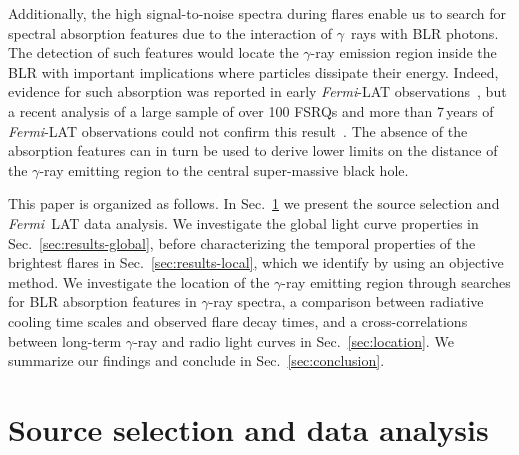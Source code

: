 \documentclass[twocolumn,linenumbers]{aastex62}
\newcommand{\Grays}{$\gamma$~rays\xspace}
\newcommand{\gray}{$\gamma$-ray\xspace}
\newcommand{\FermiLAT}{\emph{Fermi}~LAT\xspace}
\newcommand{\fermiLAT}{\emph{Fermi}-LAT\xspace}
\begin{document}
Additionally, the high signal-to-noise spectra during flares enable us to search for spectral absorption features due to the interaction of \Grays with BLR photons.
The detection of such features would locate the \gray emission region inside the BLR with important implications where particles dissipate their energy. 
Indeed, evidence for such absorption was reported in early  \fermiLAT observations~\citep{2010ApJ...717L.118P,2014ApJ...794....8S}, but a recent analysis of a large sample of over 100 FSRQs and more than 7\,years of \fermiLAT observations could not confirm this result~\citep{2018MNRAS.477.4749C}.
The absence of the absorption features can in turn be used to derive lower limits on the distance of the \gray emitting region to the central super-massive black hole. 

This paper is organized as follows. 
In Sec.~\ref{sec:data} we present the source selection and \FermiLAT data analysis. 
We investigate the global light curve properties in Sec.~\ref{sec:results-global}, before characterizing the temporal properties of the brightest flares in Sec.~\ref{sec:results-local}, which we identify by using an objective method.
We investigate the location of the \gray emitting region through searches for BLR absorption features in \gray spectra, a comparison between radiative cooling time scales and observed flare decay times, and a cross-correlations between long-term \gray and radio light curves in Sec.~\ref{sec:location}. 
We summarize our findings and conclude in Sec.~\ref{sec:conclusion}.

\section{Source selection and data analysis}
\label{sec:data}
\end{document}
